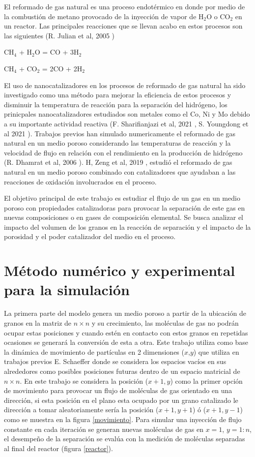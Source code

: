 \documentclass{article}
\begin{document}
El reformado de gas natural es una proceso endotérmico en donde por medio de la combustión de metano provocado de la inyección de vapor de H$_2$O o CO$_2$ en un reactor. Las principales reacciones que se llevan acabo en estos procesos son las siguientes (R. Julian et al, 2005 \citep{ROSS2005151})
\begin{center}
    CH$_4$ + H$_2$O = CO + 3H$_2$
    
    CH$_4$ + CO$_2$ = 2CO + 2H$_2$
\end{center}
El uso de nanocatalizadores en los procesos de reformado de gas natural ha sido investigado como una método para mejorar la eficiencia de estos procesos y disminuir la temperatura de reacción para la separación del hidrógeno, los prinicpales nanocatalizadores estudiados son metales como el Co, Ni y Mo debido a su importante actividad reactiva (F. Sharifianjazi et al, 2021 \citep{SHARIFIANJAZI2021}, S. Youngdong et al 2021 \citep{youngong}). Trabajos previos han simulado numericamente el reformado de gas natural en un medio poroso considerando las temperaturas de reacción y la velocidad de flujo en relación con el rendimiento en la producción de hidrógeno (R. Dhamrat et al, 2006 \citep{DHAMRAT2006698}). H, Zeng et al, 2019 \citep{ZENG201965}, estudió el reformado de gas natural en un medio poroso combinado con catalizadores que ayudaban a las reacciones de oxidación involucrados en el proceso.

 El objetivo principal de este trabajo es estudiar el flujo de un gas en un medio poroso con propiedades catalizadoras para provocar la separación de este gas en nuevas composiciones o en gases de composición elemental. Se busca analizar el impacto del volumen de los granos en la reacción de separación y el impacto de la porosidad y el poder catalizador del medio en el proceso.

\section{Método numérico y experimental para la simulación}
La primera parte del modelo genera un medio poroso a partir de la ubicación de granos en la matriz de $n \times n$ y su crecimiento, las moléculas de gas no podrán ocupar estas posiciones y cuando estén en contacto con estos granos en repetidas ocasiones se generará la conversión de esta a otra. Este trabajo utiliza como base la dinámica de movimiento de partículas en 2 dimensiones ($x$,$y$) que utiliza en trabajos previos E. Schaeffer \citep{E.Schaeffer} donde se considera los espacios vacíos en sus alrededores como posibles posiciones futuras dentro de un espacio matricial de $n \times n$. En este trabajo se considera la posición ($x+1,y$) como la primer opción de movimiento para provocar un flujo de moléculas de gas orientado en una dirección, si esta posición en el plano esta ocupado por un grano catalizado le dirección a tomar aleatoriamente sería la posición ($x+1,y+1$) ó ($x+1,y-1$) como se muestra en la figura \ref{movimiento}. Para simular una inyección de flujo constante en cada iteración se generan nuevas moléculas de gas en $x=1$, $y=1:n$, el desempeño de la separación se evalúa con la medición de moléculas separadas al final del reactor (figura \ref{reactor}).
\end{document}
